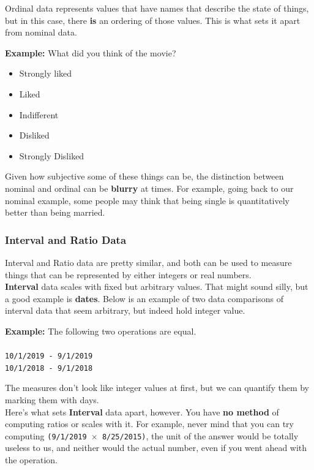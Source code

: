\documentclass[english, 10pt]{article}
\begin{document}
Ordinal data represents values that have names that describe the state of things, but in this case, there \textbf{is} an ordering of those values. This is what sets it apart from nominal data. \\ 
\begin{myproof}
\textbf{Example:} What did you think of the movie?
\begin{itemize}
	\item Strongly liked
	\item Liked
	\item Indifferent
	\item Disliked
	\item Strongly Disliked
\end{itemize}
\end{myproof}

Given how subjective some of these things can be, the distinction between nominal and ordinal can be \textbf{blurry} at times. For example, going back to our nominal example, some people may think that being single is quantitatively better than being married.

\subsubsection{Interval and Ratio Data}

Interval and Ratio data are pretty similar, and both can be used to measure things that can be represented by either integers or real numbers. \\

\textbf{Interval} data scales with fixed but arbitrary values. That might sound silly, but a good example is \textbf{dates}. Below is an example of two data comparisons of interval data that seem arbitrary, but indeed hold integer value.\\

\begin{myproof}
\textbf{Example:} The following two operations are equal. \\\\
\texttt{10/1/2019 - 9/1/2019} \\
\texttt{10/1/2018 - 9/1/2018}
\end{myproof}

The measures don't look like integer values at first, but we can quantify them by marking them with days.\\

Here's what sets \textbf{Interval} data apart, however. You have \textbf{no method} of computing ratios or scales with it. For example, never mind that you can try computing \texttt{(9/1/2019 $\times$ 8/25/2015)}, the unit of the answer would be totally useless to us, and neither would the actual number, even if you went ahead with the operation.\\
\end{document}
